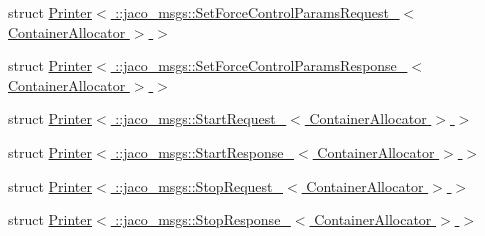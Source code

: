 \begin{DoxyCompactItemize}
\item 
struct \hyperlink{structros_1_1message__operations_1_1Printer_3_01_1_1jaco__msgs_1_1SetForceControlParamsRequest__16dc020b89aeac404d6fe4c2259e46cf}{Printer$<$ \+::jaco\+\_\+msgs\+::\+Set\+Force\+Control\+Params\+Request\+\_\+$<$ Container\+Allocator $>$ $>$}
\item 
struct \hyperlink{structros_1_1message__operations_1_1Printer_3_01_1_1jaco__msgs_1_1SetForceControlParamsResponse_198e4d90f16b65b33174a1d2bb51e7bf}{Printer$<$ \+::jaco\+\_\+msgs\+::\+Set\+Force\+Control\+Params\+Response\+\_\+$<$ Container\+Allocator $>$ $>$}
\item 
struct \hyperlink{structros_1_1message__operations_1_1Printer_3_01_1_1jaco__msgs_1_1StartRequest___3_01ContainerAllocator_01_4_01_4}{Printer$<$ \+::jaco\+\_\+msgs\+::\+Start\+Request\+\_\+$<$ Container\+Allocator $>$ $>$}
\item 
struct \hyperlink{structros_1_1message__operations_1_1Printer_3_01_1_1jaco__msgs_1_1StartResponse___3_01ContainerAllocator_01_4_01_4}{Printer$<$ \+::jaco\+\_\+msgs\+::\+Start\+Response\+\_\+$<$ Container\+Allocator $>$ $>$}
\item 
struct \hyperlink{structros_1_1message__operations_1_1Printer_3_01_1_1jaco__msgs_1_1StopRequest___3_01ContainerAllocator_01_4_01_4}{Printer$<$ \+::jaco\+\_\+msgs\+::\+Stop\+Request\+\_\+$<$ Container\+Allocator $>$ $>$}
\item 
struct \hyperlink{structros_1_1message__operations_1_1Printer_3_01_1_1jaco__msgs_1_1StopResponse___3_01ContainerAllocator_01_4_01_4}{Printer$<$ \+::jaco\+\_\+msgs\+::\+Stop\+Response\+\_\+$<$ Container\+Allocator $>$ $>$}
\end{DoxyCompactItemize}
